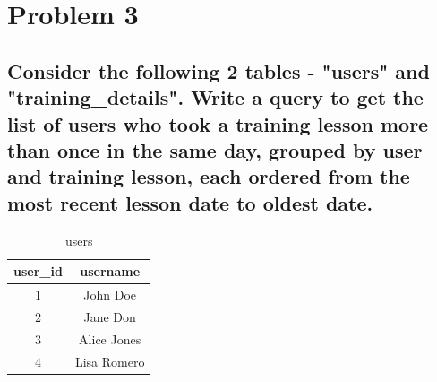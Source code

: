 \documentclass[12pt]{article}
\begin{document}

\newpage


\section{Problem 3}

\subsection*{Consider the following 2 tables - "users" and "training\_details". Write a query to get the list of users who took a training lesson more than once in the same day, grouped by user and training lesson, each ordered from the most recent lesson date to oldest date.}

\vspace{7mm}
\begin{table}[!hbt]
    \centering
    \begin{tabular}{|c|c|} 
        \hline
        \textbf{user\_id} & \textbf{username} \\ 
        \hline\hline
        1 & John Doe \\ 
        \hline
        2 & Jane Don \\
        \hline
        3 & Alice Jones \\
        \hline
        4 & Lisa Romero \\ 
        \hline
    \end{tabular}
    \caption{users}
    \label{tab:my_label}
\end{table}
\end{document}
